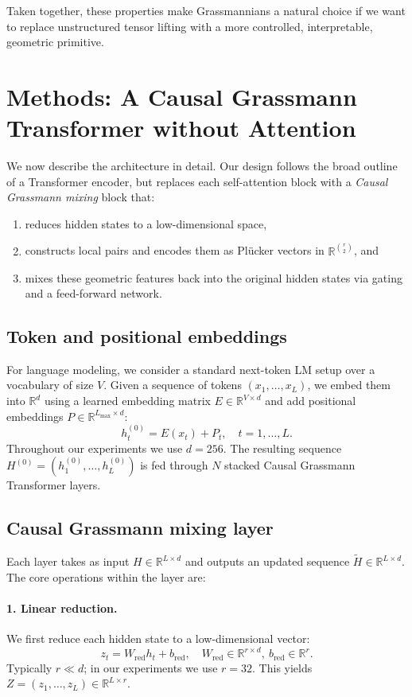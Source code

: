 \documentclass[11pt]{article}
\begin{document}
Taken together, these properties make Grassmannians a natural choice if we want to replace unstructured tensor lifting with a more controlled, interpretable, geometric primitive.

\section{Methods: A Causal Grassmann Transformer without Attention}

We now describe the architecture in detail. Our design follows the broad outline of a Transformer encoder, but replaces each self-attention block with a \emph{Causal Grassmann mixing} block that:

\begin{enumerate}
    \item reduces hidden states to a low-dimensional space,
    \item constructs local pairs and encodes them as Pl\"ucker vectors in $\mathbb{R}^{\binom{r}{2}}$, and
    \item mixes these geometric features back into the original hidden states via gating and a feed-forward network.
\end{enumerate}

\subsection{Token and positional embeddings}

For language modeling, we consider a standard next-token LM setup over a vocabulary of size $V$. Given a sequence of tokens $(x_1, \dots, x_L)$, we embed them into $\mathbb{R}^d$ using a learned embedding matrix $E \in \mathbb{R}^{V \times d}$ and add positional embeddings $P \in \mathbb{R}^{L_{\max} \times d}$:
\[
h_t^{(0)} = E(x_t) + P_t,\quad t = 1,\dots,L.
\]
Throughout our experiments we use $d = 256$. The resulting sequence $H^{(0)} = (h_1^{(0)}, \dots, h_L^{(0)})$ is fed through $N$ stacked Causal Grassmann Transformer layers.

\subsection{Causal Grassmann mixing layer}

Each layer takes as input $H \in \mathbb{R}^{L \times d}$ and outputs an updated sequence $\tilde{H} \in \mathbb{R}^{L \times d}$. The core operations within the layer are:

\paragraph{1. Linear reduction.}
We first reduce each hidden state to a low-dimensional vector:
\[
z_t = W_{\text{red}} h_t + b_{\text{red}}, \quad W_{\text{red}} \in \mathbb{R}^{r \times d},\ b_{\text{red}} \in \mathbb{R}^r.
\]
Typically $r \ll d$; in our experiments we use $r = 32$. This yields $Z = (z_1, \dots, z_L) \in \mathbb{R}^{L \times r}$.
\end{document}
